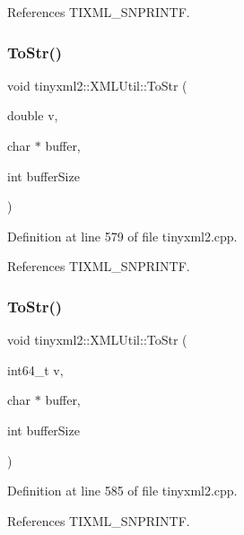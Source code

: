 References T\+I\+X\+M\+L\+\_\+\+S\+N\+P\+R\+I\+N\+TF.

\mbox{\label{classtinyxml2_1_1_x_m_l_util_a1cd141e50980fcddd6bf9af5de4b1db7}} 
\subsubsection{ToStr()\hspace{0.1cm}{\footnotesize\ttfamily [5/6]}}
{\footnotesize\ttfamily void tinyxml2\+::\+X\+M\+L\+Util\+::\+To\+Str (\begin{DoxyParamCaption}\item[{double}]{v,  }\item[{char $\ast$}]{buffer,  }\item[{int}]{buffer\+Size }\end{DoxyParamCaption})\hspace{0.3cm}{\ttfamily [static]}}



Definition at line 579 of file tinyxml2.\+cpp.



References T\+I\+X\+M\+L\+\_\+\+S\+N\+P\+R\+I\+N\+TF.

\mbox{\label{classtinyxml2_1_1_x_m_l_util_a26a8cb5b833ad587b3af39469c8111de}} 
\subsubsection{ToStr()\hspace{0.1cm}{\footnotesize\ttfamily [6/6]}}
{\footnotesize\ttfamily void tinyxml2\+::\+X\+M\+L\+Util\+::\+To\+Str (\begin{DoxyParamCaption}\item[{int64\+\_\+t}]{v,  }\item[{char $\ast$}]{buffer,  }\item[{int}]{buffer\+Size }\end{DoxyParamCaption})\hspace{0.3cm}{\ttfamily [static]}}



Definition at line 585 of file tinyxml2.\+cpp.



References T\+I\+X\+M\+L\+\_\+\+S\+N\+P\+R\+I\+N\+TF.

\mbox{\label{classtinyxml2_1_1_x_m_l_util_a210c8637d5eb4ce3d4625294af0efc2f}} 
